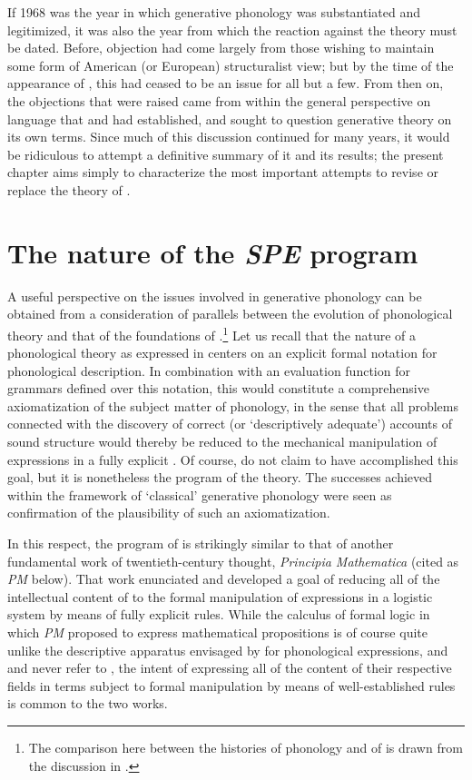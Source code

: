 If 1968 was the year in which generative phonology was substantiated
and legitimized, it was also the year from which the reaction against
the theory must be dated. Before, objection had come largely from
those wishing to maintain some form of American (or European)
structuralist view; but by the time of the appearance of \textsl{},
this had ceased to be an issue for all but a few. From then on, the
objections that were raised came from within the general perspective
on language that {\Chomsky} and {\Halle} had established, and sought to
question generative theory on its own terms. Since much of this
discussion continued for many years, it would be ridiculous to attempt
a definitive summary of it and its results; the present chapter aims
simply to characterize the most important attempts to revise or
replace the theory of \textsl{}.


\section{The nature of the \textsl{SPE} program}

A useful perspective on the issues involved in generative phonology
can be ob\-tained from a consideration of parallels between the evolution
of phonological theory and that of the foundations of
.\footnote{The comparison here between the histories of
  phonology and of  is drawn from the discussion in
  \protect\citealt{sra80:copenhagen}.} Let us recall that the nature
of a phonological theory as expressed in \textsl{} centers on an
explicit formal notation for phonological description. In combination
with an evaluation function for grammars defined over this notation,
this would constitute a comprehensive axiomatization of the subject
matter of phonology, in the sense that all problems connected with the
discovery of correct (or `descriptively adequate') accounts of sound
structure would thereby be reduced to the mechanical manipulation of
expressions in a fully explicit . Of course,
\citet{spe} do not claim to have accomplished this goal, but it is
nonetheless the program of the theory. The successes achieved within
the framework of `classical' generative phonology were seen as
confirmation of the plausibility of such an axiomatization.

In this respect, the program of \textsl{} is strikingly similar to
that of another fundamental work of twentieth-century thought,
 \textsl{Principia
  Mathematica} (cited as \textsl{PM} below). That work enunciated and
developed a goal of reducing all of the intellectual content of
 to the formal manipulation of expressions in a logistic
system by means of fully explicit rules. While the calculus of formal
logic in which \textsl{PM} proposed to express mathematical
propositions is of course quite unlike the descriptive apparatus
envisaged by \textsl{} for phonological expressions, and {\Chomsky}
and {\Halle} never refer to
\citeauthor{whitehead.russell10-13:principia}, the intent of
expressing all of the content of their respective fields in terms
subject to formal manipulation by means of well-established rules is
common to the two works.


